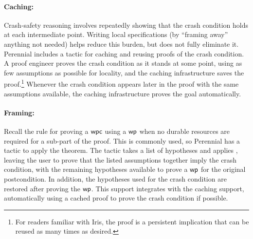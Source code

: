 \paragraph{Caching:} Crash-safety reasoning involves repeatedly showing
that the crash condition holds at each intermediate point.
Writing local specifications (by ``framing away'' anything not needed)
helps reduce this burden, but does not fully eliminate it.
Perennial includes a tactic for caching and reusing proofs of the crash condition.
A proof
engineer proves the crash condition as it stands at some point, using
as few assumptions as possible for locality, and the caching infrastructure saves
the proof.\footnote{For readers familiar with Iris, the proof is a persistent
implication that can be reused as many times as desired.}
Whenever the
crash condition appears later in the proof with the same assumptions available,
the caching infrastructure proves the goal automatically.

\paragraph{Framing:} Recall the  rule for
proving a $\textsf{\upshape wpc}$ using a $\textsf{\upshape wp}$ when no durable resources are required for a
sub-part of the proof. This is commonly used, so Perennial has a 
tactic to apply the theorem. The tactic takes a list of hypotheses and applies
, leaving the user to prove that the listed assumptions
together imply the crash condition, with the remaining hypotheses available to
prove a $\textsf{\upshape wp}$ for the original postcondition. In addition, the hypotheses used
for the crash condition are restored after proving the $\textsf{\upshape wp}$. This support
integrates with the caching support, automatically using a cached proof to prove
the crash condition if possible.

